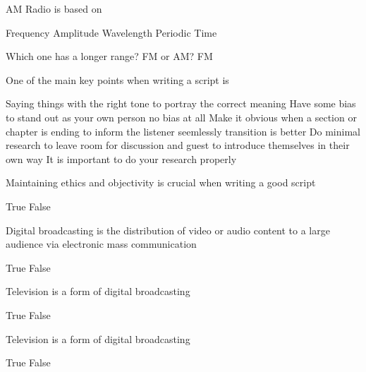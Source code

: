 \begin{question}
  AM Radio is based on
  \begin{choice}
    \incorrect Frequency
    \correct Amplitude
    \incorrect Wavelength
    \incorrect Periodic Time
  \end{choice}
\end{question}

\begin{question}
  Which one has a longer range? FM or AM?
  \answer[lower] FM
\end{question}

\begin{question}
  One of the main key points when writing a script is
  \begin{choice}
    \correct Saying things with the right tone to portray the correct meaning
    \incorrect Have some bias to stand out as your own person
    \feedback no bias at all
    \incorrect Make it obvious when a section or chapter is ending to inform the listener
    \feedback seemlessly transition is better
    \incorrect Do minimal research to leave room for discussion and guest to introduce themselves in their own way
    \feedback It is important to do your research properly
  \end{choice}
\end{question}

\begin{question}
    Maintaining ethics and objectivity is crucial when writing a good script
  \begin{choice}
    \correct True
    \incorrect False
  \end{choice}
\end{question}

\begin{question}
    Digital broadcasting is the distribution of video or audio content to a large audience via electronic mass communication
  \begin{choice}
    \correct True
    \incorrect False
  \end{choice}
\end{question}

\begin{question}
  Television is a form of digital broadcasting
  \begin{choice}
    \correct True
    \incorrect False
  \end{choice}
\end{question}

\begin{question}
  Television is a form of digital broadcasting
  \begin{choice}
    \correct True
    \incorrect False
  \end{choice}
\end{question}

